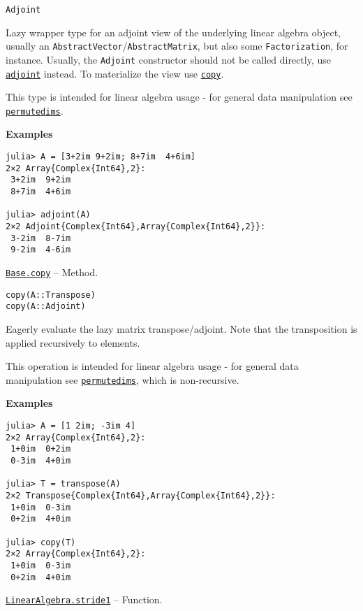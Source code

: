 \begin{adjustwidth}{2em}{0pt}


\begin{verbatim}
Adjoint
\end{verbatim}

Lazy wrapper type for an adjoint view of the underlying linear algebra object, usually an \texttt{AbstractVector}/\texttt{AbstractMatrix}, but also some \texttt{Factorization}, for instance. Usually, the \texttt{Adjoint} constructor should not be called directly, use \hyperlink{10565518144285607255}{\texttt{adjoint}} instead. To materialize the view use \hyperlink{15665284441316555522}{\texttt{copy}}.

This type is intended for linear algebra usage - for general data manipulation see \hyperlink{10913801624539723467}{\texttt{permutedims}}.

\textbf{Examples}


\begin{verbatim}
julia> A = [3+2im 9+2im; 8+7im  4+6im]
2×2 Array{Complex{Int64},2}:
 3+2im  9+2im
 8+7im  4+6im

julia> adjoint(A)
2×2 Adjoint{Complex{Int64},Array{Complex{Int64},2}}:
 3-2im  8-7im
 9-2im  4-6im
\end{verbatim}



\end{adjustwidth}
\hypertarget{16739145811029380235}{} 
\hyperlink{16739145811029380235}{\texttt{Base.copy}}  -- {Method.}

\begin{adjustwidth}{2em}{0pt}


\begin{verbatim}
copy(A::Transpose)
copy(A::Adjoint)
\end{verbatim}

Eagerly evaluate the lazy matrix transpose/adjoint. Note that the transposition is applied recursively to elements.

This operation is intended for linear algebra usage - for general data manipulation see \hyperlink{10913801624539723467}{\texttt{permutedims}}, which is non-recursive.

\textbf{Examples}


\begin{verbatim}
julia> A = [1 2im; -3im 4]
2×2 Array{Complex{Int64},2}:
 1+0im  0+2im
 0-3im  4+0im

julia> T = transpose(A)
2×2 Transpose{Complex{Int64},Array{Complex{Int64},2}}:
 1+0im  0-3im
 0+2im  4+0im

julia> copy(T)
2×2 Array{Complex{Int64},2}:
 1+0im  0-3im
 0+2im  4+0im
\end{verbatim}



\end{adjustwidth}
\hypertarget{17430342268269872501}{} 
\hyperlink{17430342268269872501}{\texttt{LinearAlgebra.stride1}}  -- {Function.}

